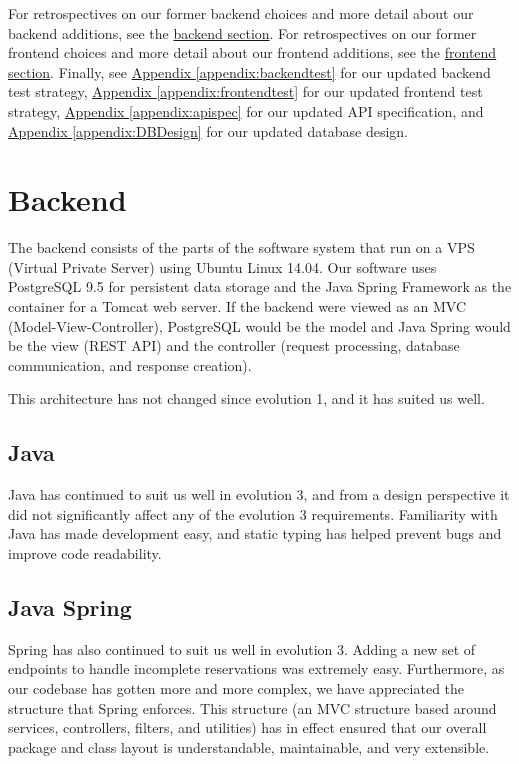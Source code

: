 \documentclass[12pt]{article}
\begin{document}
For retrospectives on our former backend choices and more detail about our backend additions, see the \hyperref[sec:Backend]{backend section}. For retrospectives on our former frontend choices and more detail about our frontend additions, see the \hyperref[sec:Frontend]{frontend section}. Finally, see \hyperref[appendix:backendtest]{Appendix \ref{appendix:backendtest}} for our updated backend test strategy,  \hyperref[appendix:frontendtest]{Appendix \ref{appendix:frontendtest}} for our updated frontend test strategy, \hyperref[appendix:apispec]{Appendix \ref{appendix:apispec}} for our updated API specification, and \hyperref[appendix:DBDesign]{Appendix \ref{appendix:DBDesign}} for our updated database design. 

\section{Backend}

\label{sec:Backend}
The backend consists of the parts of the software system that run on a VPS (Virtual Private Server) using Ubuntu Linux 14.04. Our software uses PostgreSQL 9.5 for persistent data storage and the Java Spring Framework as the container for a Tomcat web server. If the backend were viewed as an MVC (Model-View-Controller), PostgreSQL would be the model and Java Spring would be the view (REST API) and the controller (request processing, database communication, and response creation). 

This architecture has not changed since evolution 1, and it has suited us well. 

\subsection{Java}
Java has continued to suit us well in evolution 3, and from a design perspective it did not significantly affect any of the evolution 3 requirements. Familiarity with Java has made development easy, and static typing has helped prevent bugs and improve code readability.

\subsection{Java Spring}
Spring has also continued to suit us well in evolution 3. Adding a new set of endpoints to handle incomplete reservations was extremely easy. Furthermore, as our codebase has gotten more and more complex, we have appreciated the structure that Spring enforces. This structure (an MVC structure based around services, controllers, filters, and utilities) has in effect ensured that our overall package and class layout is understandable, maintainable, and very extensible. 
\end{document}
